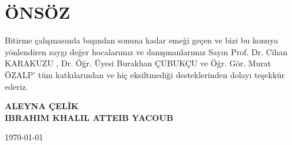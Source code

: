 \section*{ÖNSÖZ}
Bitirme çalışmasında başından sonuna kadar emeği geçen ve bizi bu konuya yönlendiren saygı değer hocalarımız ve danışmanlarımız Sayın Prof. Dr. Cihan KARAKUZU , Dr. Öğr. Üyesi Burakhan ÇUBUKÇU ve 
Öğr. Gör. Murat ÖZALP' tüm katkılarından ve hiç eksiltmediği desteklerinden dolayı teşekkür ederiz.

\begin{flushright}
\textbf{ALEYNA ÇELİK \\ IBRAHIM KHALIL ATTEIB YACOUB}

\today
\end{flushright}